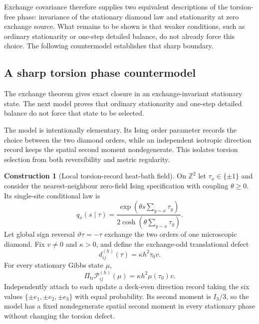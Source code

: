 \documentclass[11pt]{article}
\theoremstyle{definition}
\newtheorem{construction}[theorem]{Construction}
\theoremstyle{remark}
\newcommand{\Z}{\mathbb Z}
\begin{document}
Exchange covariance therefore supplies two equivalent descriptions of the
torsion-free phase: invariance of the stationary diamond law and stationarity at
zero exchange source.  What remains to be shown is that weaker conditions, such
as ordinary stationarity or one-step detailed balance, do not already force this
choice.  The following countermodel establishes that sharp boundary.

\subsection{A sharp torsion phase countermodel}
\label{subsec:torsion-countermodel}

The exchange theorem gives exact closure in an exchange-invariant stationary
state.  The next model proves that ordinary stationarity and one-step detailed
balance do not force that state to be selected.

The model is intentionally elementary.  Its Ising order parameter records the
choice between the two diamond orders, while an independent isotropic direction
record keeps the spatial second moment nondegenerate.  This isolates torsion
selection from both reversibility and metric regularity.

\begin{construction}[Local torsion-record heat-bath field]
\label{constr:torsion-ising}
On $\Z^2$ let $\tau_x\in\{\pm1\}$ and consider the nearest-neighbour zero-field
Ising specification with coupling $\theta\ge0$.  Its single-site conditional law
is
\[
 q_x(s\mid\tau)
 =\frac{\exp\!\left(\theta s\sum_{y\sim x}\tau_y\right)}
        {2\cosh\!\left(\theta\sum_{y\sim x}\tau_y\right)}.
\]
Let global sign reversal $\vartheta\tau=-\tau$ exchange the two orders of one
microscopic diamond.  Fix $v\ne0$ and $\kappa>0$, and define the exchange-odd
translational defect
\[
 d_{ij}^{(h)}(\tau)=\kappa h^2\tau_0v.
\]
For every stationary Gibbs state $\mu$,
\[
 \Pi_{\mathrm{tr}}\mathcal P_{ij}^{(h)}(\mu)
 =\kappa h^2\mu(\tau_0)v.
\]
Independently attach to each update a deck-even direction record taking the six
values $\{\pm e_1,\pm e_2,\pm e_3\}$ with equal probability.  Its second moment
is $I_3/3$, so the model has a fixed nondegenerate spatial second moment in every
stationary phase without changing the torsion defect.
\end{construction}
\end{document}
